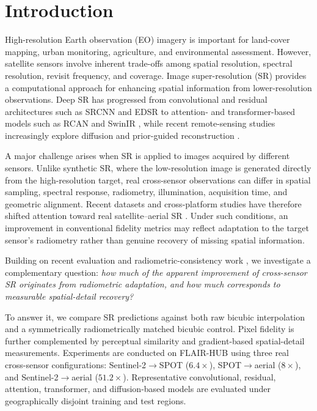 \documentclass[conference]{IEEEtran}
\begin{document}
 \section{Introduction}
\label{sec:introduction}

High-resolution Earth observation (EO) imagery is important for
land-cover mapping, urban monitoring, agriculture, and environmental
assessment. However, satellite sensors involve inherent trade-offs
among spatial resolution, spectral resolution, revisit frequency, and
coverage. Image super-resolution (SR) provides a computational approach
for enhancing spatial information from lower-resolution observations.
Deep SR has progressed from convolutional and residual architectures
such as SRCNN and EDSR \cite{dong2016srcnn,lim2017edsr} to
attention- and transformer-based models such as RCAN and SwinIR
\cite{zhang2018rcan,liang2021swinir}, while recent remote-sensing
studies increasingly explore diffusion and prior-guided reconstruction
\cite{sgdm2025,li2025dlmsr}.

A major challenge arises when SR is applied to images acquired by
different sensors. Unlike synthetic SR, where the low-resolution image
is generated directly from the high-resolution target, real
cross-sensor observations can differ in spatial sampling, spectral
response, radiometry, illumination, acquisition time, and geometric
alignment. Recent datasets and cross-platform studies have therefore
shifted attention toward real satellite--aerial SR
\cite{aybar2024sen2naip,wang2026crossplatform}. Under such conditions,
an improvement in conventional fidelity metrics may reflect adaptation
to the target sensor's radiometry rather than genuine recovery of
missing spatial information.

Building on recent evaluation and radiometric-consistency work
\cite{aybar2024benchmark,aybar2026sen2sr}, we investigate a
complementary question: \emph{how much of the apparent improvement
of cross-sensor SR originates from radiometric adaptation, and how
much corresponds to measurable spatial-detail recovery?}

To answer it, we compare SR predictions against both raw bicubic
interpolation and a symmetrically radiometrically matched bicubic
control. Pixel fidelity is further complemented by perceptual
similarity and gradient-based spatial-detail measurements. Experiments
are conducted on FLAIR-HUB \cite{garioud2026flairhub} using three real
cross-sensor configurations: Sentinel-2$\rightarrow$SPOT
($6.4\times$), SPOT$\rightarrow$aerial ($8\times$), and
Sentinel-2$\rightarrow$aerial ($51.2\times$). Representative
convolutional, residual, attention, transformer, and diffusion-based
models are evaluated under geographically disjoint training and test
regions.
\end{document}
